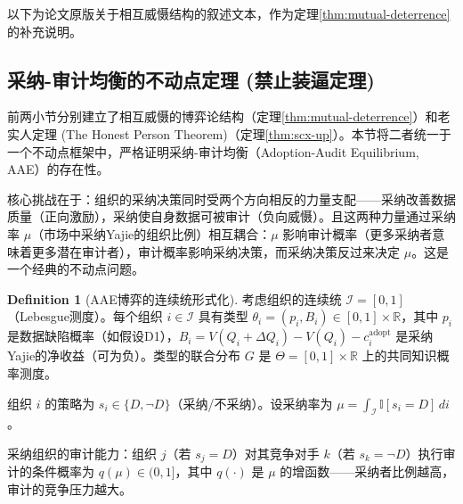 \documentclass[12pt,a4paper]{ctexart}
\theoremstyle{definition}
\newtheorem{definition}{Definition}[section]
\theoremstyle{remark}
\begin{document}
以下为论文原版关于相互威慑结构的叙述文本，作为定理\ref{thm:mutual-deterrence}的补充说明。

\subsection{采纳-审计均衡的不动点定理 (禁止装逼定理)}

前两小节分别建立了相互威慑的博弈论结构（定理\ref{thm:mutual-deterrence}）和老实人定理 (The Honest Person Theorem)（定理\ref{thm:scx-up}）。本节将二者统一于一个不动点框架中，严格证明采纳-审计均衡（Adoption-Audit Equilibrium, AAE）的存在性。

核心挑战在于：组织的采纳决策同时受两个方向相反的力量支配——采纳改善数据质量（正向激励），采纳使自身数据可被审计（负向威慑）。且这两种力量通过采纳率 $\mu$（市场中采纳Yajie的组织比例）相互耦合：$\mu$ 影响审计概率（更多采纳者意味着更多潜在审计者），审计概率影响采纳决策，而采纳决策反过来决定 $\mu$。这是一个经典的不动点问题。

\begin{definition}[AAE博弈的连续统形式化]
\label{def:aae-continuum}
考虑组织的连续统 $\mathcal{I} = [0,1]$（Lebesgue测度）。每个组织 $i \in \mathcal{I}$ 具有类型 $\theta_i = (p_i, B_i) \in [0,1] \times \mathbb{R}$，其中 $p_i$ 是数据缺陷概率（如假设D1），$B_i = V(Q_i + \Delta Q_i) - V(Q_i) - c_i^{\text{adopt}}$ 是采纳Yajie的净收益（可为负）。类型的联合分布 $G$ 是 $\Theta = [0,1] \times \mathbb{R}$ 上的共同知识概率测度。

组织 $i$ 的策略为 $s_i \in \{D, \neg D\}$（采纳/不采纳）。设采纳率为 $\mu = \int_{\mathcal{I}} \mathbb{I}[s_i = D] \, di$。

采纳组织的审计能力：组织 $j$（若 $s_j = D$）对其竞争对手 $k$（若 $s_k = \neg D$）执行审计的条件概率为 $q(\mu) \in (0, 1]$，其中 $q(\cdot)$ 是 $\mu$ 的增函数——采纳者比例越高，审计的竞争压力越大。
\end{definition}
\end{document}
